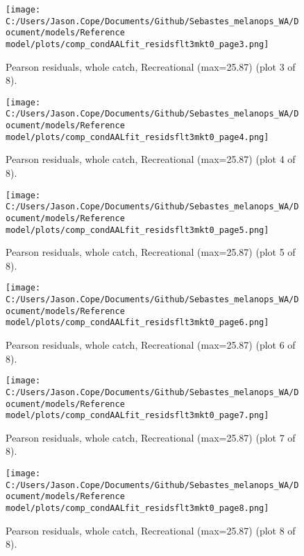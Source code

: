 \documentclass[11pt,
  english,
  letterpaper,
]{article}
\begin{document}
\begin{figure}
\centering
\texttt{[image: C:/Users/Jason.Cope/Documents/Github/Sebastes\_melanops\_WA/Document/models/Reference model/plots/comp\_condAALfit\_residsflt3mkt0\_page3.png]}
\caption{Pearson residuals, whole catch, Recreational (max=25.87) (plot 3 of 8).\label{fig:comp_condAALfit_residsflt3mkt0_page3}}
\end{figure}

\begin{figure}
\centering
\texttt{[image: C:/Users/Jason.Cope/Documents/Github/Sebastes\_melanops\_WA/Document/models/Reference model/plots/comp\_condAALfit\_residsflt3mkt0\_page4.png]}
\caption{Pearson residuals, whole catch, Recreational (max=25.87) (plot 4 of 8).\label{fig:comp_condAALfit_residsflt3mkt0_page4}}
\end{figure}

\begin{figure}
\centering
\texttt{[image: C:/Users/Jason.Cope/Documents/Github/Sebastes\_melanops\_WA/Document/models/Reference model/plots/comp\_condAALfit\_residsflt3mkt0\_page5.png]}
\caption{Pearson residuals, whole catch, Recreational (max=25.87) (plot 5 of 8).\label{fig:comp_condAALfit_residsflt3mkt0_page5}}
\end{figure}

\begin{figure}
\centering
\texttt{[image: C:/Users/Jason.Cope/Documents/Github/Sebastes\_melanops\_WA/Document/models/Reference model/plots/comp\_condAALfit\_residsflt3mkt0\_page6.png]}
\caption{Pearson residuals, whole catch, Recreational (max=25.87) (plot 6 of 8).\label{fig:comp_condAALfit_residsflt3mkt0_page6}}
\end{figure}

\begin{figure}
\centering
\texttt{[image: C:/Users/Jason.Cope/Documents/Github/Sebastes\_melanops\_WA/Document/models/Reference model/plots/comp\_condAALfit\_residsflt3mkt0\_page7.png]}
\caption{Pearson residuals, whole catch, Recreational (max=25.87) (plot 7 of 8).\label{fig:comp_condAALfit_residsflt3mkt0_page7}}
\end{figure}

\begin{figure}
\centering
\texttt{[image: C:/Users/Jason.Cope/Documents/Github/Sebastes\_melanops\_WA/Document/models/Reference model/plots/comp\_condAALfit\_residsflt3mkt0\_page8.png]}
\caption{Pearson residuals, whole catch, Recreational (max=25.87) (plot 8 of 8).\label{fig:comp_condAALfit_residsflt3mkt0_page8}}
\end{figure}
\end{document}
